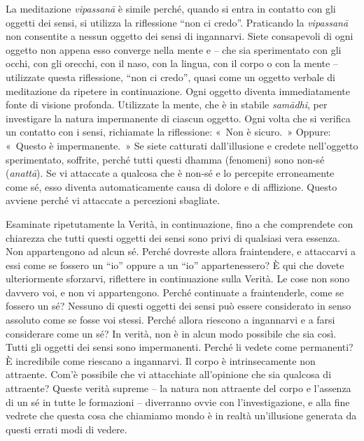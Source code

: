 La meditazione \emph{vipassanā} è simile perché, quando si entra in
contatto con gli oggetti dei sensi, si utilizza la riflessione ``non ci
credo''. Praticando la \emph{vipassanā} non consentite a nessun oggetto
dei sensi di ingannarvi. Siete consapevoli di ogni oggetto non appena
esso converge nella mente e -- che sia sperimentato con gli occhi, con
gli orecchi, con il naso, con la lingua, con il corpo o con la mente --
utilizzate questa riflessione, ``non ci credo'', quasi come un oggetto
verbale di meditazione da ripetere in continuazione. Ogni oggetto
diventa immediatamente fonte di visione profonda. Utilizzate la mente,
che è in stabile \emph{samādhi}, per investigare la natura impermanente
di ciascun oggetto. Ogni volta che si verifica un contatto con i sensi,
richiamate la riflessione: «~Non è sicuro.~» Oppure: «~Questo è
impermanente.~» Se siete catturati dall'illusione e credete nell'oggetto
sperimentato, soffrite, perché tutti questi dhamma (fenomeni)
sono non-sé (\emph{anattā}). Se vi attaccate a qualcosa che è non-sé e
lo percepite erroneamente come sé, esso diventa automaticamente causa di
dolore e di afflizione. Questo avviene perché vi attaccate a percezioni
sbagliate.

Esaminate ripetutamente la Verità, in continuazione, fino a che
comprendete con chiarezza che tutti questi oggetti dei sensi sono privi
di qualsiasi vera essenza. Non appartengono ad alcun sé. Perché dovreste
allora fraintendere, e attaccarvi a essi come se fossero un ``io''
oppure a un ``io'' appartenessero? È qui che dovete ulteriormente
sforzarvi, riflettere in continuazione sulla Verità. Le cose non sono
davvero voi, e non vi appartengono. Perché continuate a fraintenderle,
come se fossero un sé? Nessuno di questi oggetti dei sensi può essere
considerato in senso assoluto come se fosse voi stessi. Perché allora
riescono a ingannarvi e a farsi considerare come un sé? In verità, non è
in alcun modo possibile che sia così. Tutti gli oggetti dei sensi sono
impermanenti. Perché li vedete come permanenti? È incredibile come
riescano a ingannarvi. Il corpo è intrinsecamente non attraente. Com'è
possibile che vi attacchiate all'opinione che sia qualcosa di attraente?
Queste verità supreme -- la natura non attraente del corpo e l'assenza
di un sé in tutte le formazioni -- diverranno ovvie con
l'investigazione, e alla fine vedrete che questa cosa che chiamiamo
mondo è in realtà un'illusione generata da questi errati modi di vedere.

